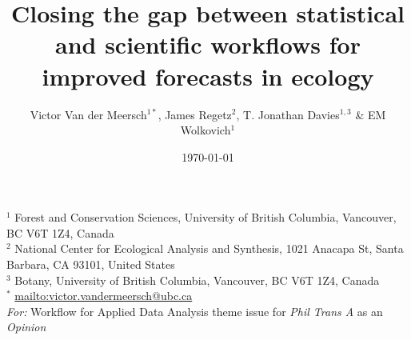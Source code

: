 \documentclass[11pt]{article}
\begin{document}
\title{Closing the gap between statistical and scientific workflows for improved forecasts in ecology}
\date{\today}
\author{Victor Van der Meersch$^{1*}$, James Regetz$^{2}$, T. Jonathan Davies$^{1,3}$ \& EM Wolkovich$^{1}$}
\maketitle
\noindent $^{1}$ Forest and Conservation Sciences, University of British Columbia, Vancouver, BC V6T 1Z4, Canada\\
$^{2}$ National Center for Ecological Analysis and Synthesis, 1021 Anacapa St, Santa Barbara, CA 93101, United States\\
$^{3}$ Botany, University of British Columbia, Vancouver, BC V6T 1Z4, Canada \\
$^{*}$ \url{mailto:victor.vandermeersch@ubc.ca}\\

\noindent \emph{For:} Workflow for Applied Data Analysis theme issue for \emph{Phil Trans A} as an \emph{Opinion}
\end{document}
